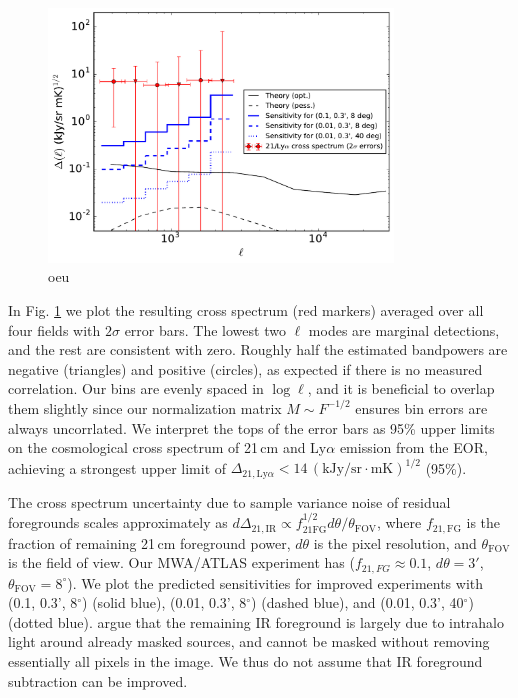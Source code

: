 \documentclass{emulateapj}
\newcommand{\IR}{\text{IR}}
\begin{document}
\begin{figure}[h]
\centering
\includegraphics[width=3.6in]{images/mwa_atlas_xspec_with_2Dsimtheory_and_2sigma_errors_6bins.pdf}
\caption{oeu}
\label{fig:resxspec}
\end{figure}

In Fig. \ref{fig:resxspec} we plot the resulting cross spectrum (red markers) averaged over all four fields with $2\sigma$ error bars. The lowest two $\ell$ modes are marginal detections, and the rest are consistent with zero. Roughly half the estimated bandpowers are negative (triangles) and positive (circles), as expected if there is no measured correlation.  Our bins are evenly spaced in $\log \ell$, and it is beneficial to overlap them slightly since our normalization matrix $M\sim F^{-1/2}$ ensures bin errors are always uncorrlated.  We interpret the tops of the error bars as 95\% upper limits on the cosmological cross spectrum of 21\,cm and Ly$\alpha$ emission from the EOR, achieving a strongest upper limit of $\Delta_{21,\text{Ly}\alpha}<14\,(\text{kJy/sr}\cdot \text{mK})^{1/2}$ (95\%). 

The cross spectrum uncertainty due to sample variance noise of residual foregrounds scales approximately as $d\Delta_{21,\IR}\propto f_{21\text{FG}}^{1/2}d\theta/\theta_{\text{FOV}}$, where $f_{21,\text{FG}}$ is the fraction of remaining 21\,cm foreground power, $d\theta$ is the pixel resolution, and $\theta_{\text{FOV}}$ is the field of view. Our MWA/ATLAS experiment has ($f_{21,FG}\approx0.1$, $d\theta=3'$, $\theta_{\text{FOV}}=8^\circ$). We plot the predicted sensitivities for improved experiments with (0.1, 0.3', 8$^\circ$) (solid blue), (0.01, 0.3', 8$^\circ$) (dashed blue), and (0.01, 0.3', 40$^\circ$) (dotted blue). \citet{zemcov14,cooray12} argue that the remaining IR foreground is largely due to intrahalo light around already masked sources, and cannot be masked without removing essentially all pixels in the image. We thus do not assume that IR foreground subtraction can be improved.
\end{document}
